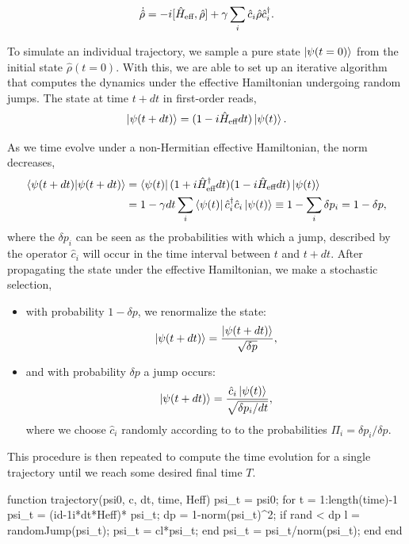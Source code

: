 \begin{equation}
	\label{eq:meq_heff}
	\dot{\hat{\rho}} = -i [\hat{H}_\text{eff}, \hat{\rho}] + \gamma \sum\limits_i \hat{c}_i \hat{\rho} \hat{c}_i^\dagger.
\end{equation}

To simulate an individual trajectory, we sample a pure state $\ket{\psi{(t =0)}}$ from the initial state $\hat{\rho}(t = 0)$.  With this, we are able to set up an iterative algorithm that computes the dynamics under the effective Hamiltonian undergoing random jumps. The state at time $t+ dt$ in first-order reads,
\begin{equation}
	\label{eq:traj_dt}
	\ket{\psi(t+dt)} = (1 - i \hat{H}_\text{eff} dt) \ket{\psi(t)}.
\end{equation}

As we time evolve under a non-Hermitian effective Hamiltonian, the norm decreases, 
	\begin{align}
    \label{eq:dp}
		\braket{\psi(t+dt)} &= \bra{\psi(t)} (1 + i \hat{H}_\text{eff}^\dagger dt)(1- i \hat{H}_\text{eff} dt)  \ket{\psi(t)} \\
		&= 1 - \gamma dt \sum\limits_i  \bra{\psi(t)} \hat{c}^\dagger_i \hat{c}_i  \ket{\psi(t)} \equiv 1 - \sum\limits_i \delta p_i = 1 - \delta p,
	\end{align}
where the $\delta p_i$ can be seen as the probabilities with which a jump, described by the operator $\hat{c}_i$ will occur in the time interval between $t$ and $t+dt$. 
After propagating the state under the effective Hamiltonian, we make a stochastic selection,
\begin{itemize}
	\item with probability $1-\delta p$, we renormalize the state:
	\begin{equation}
		\ket{\psi(t+dt)} = \frac{	\ket{\psi(t+dt)} }{\sqrt{\delta p}},
	\end{equation}
\item and with probability $\delta p$ a jump occurs:
	\begin{equation}
		\label{eq:jump}
	\ket{\psi(t+dt)} = \frac{	\hat{c}_i \ket{\psi(t)} }{\sqrt{\delta p_i/dt}},
	\end{equation}
where we choose $\hat{c}_i$ randomly according to to the probabilities $\Pi_i = \delta p_i/\delta p$. 
\end{itemize}
This procedure is then repeated to compute the time evolution for a single trajectory until we reach some desired final time $T$.

\begin{mylisting}
    function trajectory(psi0, c, dt, time, Heff)
        psi_t = psi0; %
        for t = 1:length(time)-1
            psi_t = (id-1i*dt*Heff)* psi_t; %
            dp = 1-norm(psi_t)^2; %
            if rand < dp 
                l = randomJump(psi_t); 
                psi_t = c{l}*psi_t; %
            end
            psi_t = psi_t/norm(psi_t); %
        end
    end
\end{mylisting}    

